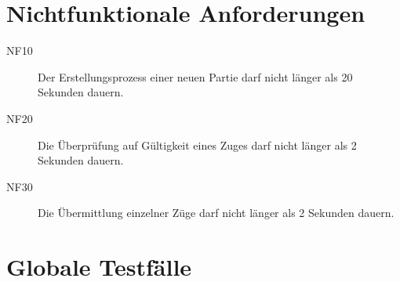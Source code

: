 \documentclass[parskip=full]{scrartcl}
\begin{document}
\section{Nichtfunktionale Anforderungen}
\begin{description}
	
	\item[NF10] Der Erstellungsprozess einer neuen Partie darf nicht länger als 20 Sekunden dauern.
	\item[NF20] Die Überprüfung auf Gültigkeit eines Zuges darf nicht länger als 2 Sekunden dauern.
	\item[NF30] Die Übermittlung einzelner Züge darf nicht länger als 2 Sekunden dauern.
	
\end{description}
	\section{Globale Testfälle}
\end{document}
